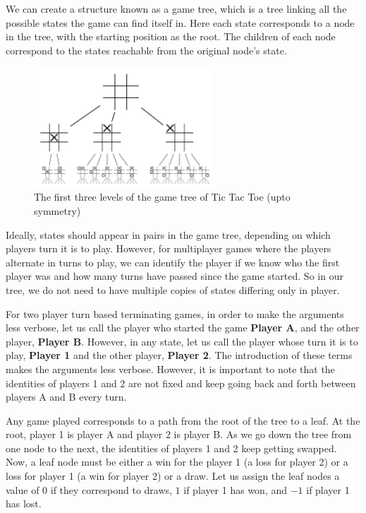 \documentclass[12pt]{report}
\begin{document}
We can create a structure known as a game tree, which is a tree linking all the possible states the game can find itself in.
Here each state corresponds to a node in the tree, with the starting position as the root. The children of each node correspond to the states reachable from the original node's state.
\begin{figure}[H]
    \centering
    \includegraphics[width=0.6\textwidth]{images/tic_tac_toe_game_tree.png}
    \caption{The first three levels of the game tree of Tic Tac Toe (upto symmetry)}
\end{figure}

Ideally, states should appear in pairs in the game tree, depending on which players turn it is to play. However, for multiplayer games where the players alternate in turns to play, we
can identify the player if we know who the first player was and how many turns have passed since the game started. So in our tree, we do not need to have multiple copies of states differing only in player.

For two player turn based terminating games, in order to make the arguments less verbose, let us call the player who started the game \textbf{Player A}, and the other player, \textbf{Player B}.
However, in any state, let us call the player whose turn it is to play, \textbf{Player 1} and the other player, \textbf{Player 2}. The introduction of these terms makes the arguments less verbose.
However, it is important to note that the identities of players 1 and 2 are not fixed and keep going back and forth between players A and B every turn.

Any game played corresponds to a path from the root of the tree to a leaf. At the root, player 1 is player A and player 2 is player B. As we go down the tree from one node to the next, the identities of players 1 and 2 keep getting swapped.
Now, a leaf node must be either a win for the player 1 (a loss for player 2) or a loss for player 1 (a win for player 2) or a draw.
Let us assign the leaf nodes a value of $0$ if they correspond to draws, $1$ if player 1 has won, and $-1$ if player 1 has lost. 
\end{document}
